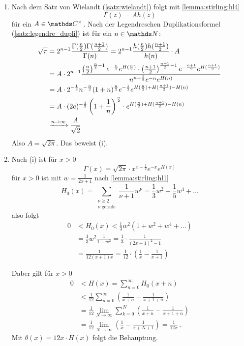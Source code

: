 \begin{bewe}\leavevmode
\begin{enumerate}
\item Nach dem Satz von Wielandt (\autoref{satz:wielandt}) folgt mit \autoref{lemma:stirling:hl4}
\[
	\Gamma(z) = Ah(z)
\]
für ein $A\in\CC^\times$.
Nach der Legendreschen Duplikationsformel (\autoref{satz:legendre_dupli}) ist für ein $n\in\NN$:
\begin{align*}
	\sqrt{\pi}
	&= 2^{n-1} \frac{\Gamma(\frac{n}{2}) \Gamma(\frac{n+1}{2})}{\Gamma(n)}
	= 2^{n-1} \frac{h(\frac{n}{2}) h(\frac{n+1}{2})}{h(n)} \cdot A \\
	&= A \cdot 2^{n-1}\frac{\left(\frac{n}{2}\right)^{\frac{n}{2}-1} e^{-\frac{n}{2}} e^{H(\frac{n}{2})} \cdot \left(\frac{n+1}{2}\right)^{\frac{n+1}{2}-1} e^{-\frac{n+1}{2}} e^{H(\frac{n+1}{2})}}{n^{n-\frac{1}{2}}e^{-n}e^{H(n)}} \\
	&= A \cdot 2^{-\frac{1}{2}}n^{-\frac{n}{2}}(1+n)^{\frac{n}{2}} e^{-\frac{1}{2}} e^{H(\frac{n}{2})+H(\frac{n+1}{2}) - H(n)} \\
	&= A\cdot (2e)^{-\frac{1}{2}} \left(1+\frac{1}{n}\right)^\frac{n}{2} \cdot e^{H(\frac{n}{2})+H(\frac{n+1}{2}) - H(n)} \\
	&\xrightarrow{n\to\infty} \frac{A}{\sqrt{2}}
\end{align*}
Also $A = \sqrt{2\pi}$. Das beweist (i).



\item Nach (i) ist für $x > 0$
\[
	\Gamma(x) = \sqrt{2\pi} \cdot x^{x-\frac{1}{2}} e^{-x} e^{H(x)}
\]
für $x>0$ ist mit $w = \frac{1}{2x+1}$ nach \autoref{lemma:stirling:hl1}
\[
	H_0(x) = \sum_{\substack{\nu\geq 2 \\ \scriptscriptstyle \nu \text{ gerade}}} \frac{1}{\nu+1}w^\nu
	= \frac{1}{3}w^2 + \frac{1}{5}w^4 + \ldots
\]
also folgt
\begin{align*}
	0
	&< H_0(x)
	< \frac{1}{3}w^2 (1+w^2+w^4+\ldots) \\
	&= \frac{1}{3}w^2 \frac{1}{1-w^2}
	= \frac{1}{3} \cdot \frac{1}{(2x+1)^2-1} \\
	&= \frac{1}{12(x+1)x}
	= \frac{1}{12} \cdot \left( \frac{1}{x} - \frac{1}{x+1} \right)
\end{align*}

Daber gilt für $x > 0$
\begin{align*}
	0
	&< H(x)
	= \sum_{n=0}^\infty H_0(x+n) \\
	&< \frac{1}{12} \sum_{n=0}^\infty \left(\frac{1}{x+n} - \frac{1}{x+1+n}\right) \\
	&= \frac{1}{12} \lim_{N\to\infty} \sum_{k=0}^N \left(\frac{1}{x+n} - \frac{1}{x+1+n}\right) \\
	&= \frac{1}{12}\lim_{N\to\infty} \left(\frac{1}{x}-\frac{1}{x+N+1}\right)
	= \frac{1}{12x}
	\,.
\end{align*}
Mit $\theta(x) = 12x\cdot H(x)$ folgt die Behauptung.
\end{enumerate}
\end{bewe}